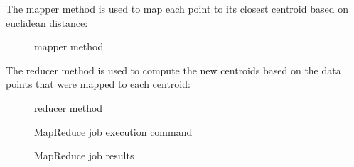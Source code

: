 \documentclass[11pt]{article}
\begin{document}
\newpage
The mapper method is used to map each point to its closest centroid based on euclidean distance:
\begin{figure}[H]
		\caption{mapper method}
	\end{figure}
	The reducer method is used to compute the new centroids based on the data points that were mapped to each centroid:
	\begin{figure}[H]
		\caption{reducer method}
	\end{figure}
	
	\begin{figure}[H]
		\caption{MapReduce job execution command}
	\end{figure}
	
	

	
	
\begin{figure}[H]
		\caption{MapReduce job results}
	\end{figure}
	
\end{document}

